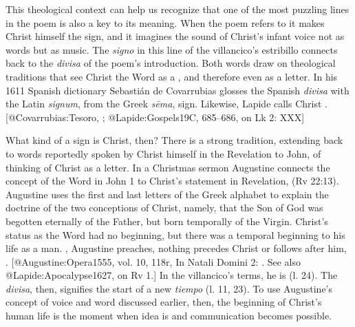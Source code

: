 This theological context can help us recognize that one of the most puzzling
lines in the poem is also a key to its meaning. 
When the poem refers to  it makes Christ himself
the sign, and it imagines the sound of Christ's infant voice not as words but as
music. 
The \emph{signo} in this line of the villancico's estribillo connects back to the
\emph{divisa} of the poem's introduction.
Both words draw on theological traditions that see Christ the Word as a ,
and therefore even as a letter.
In his 1611 Spanish dictionary Sebastián de Covarrubias glosses the Spanish
\emph{divisa} with the Latin \emph{signum}, from the Greek \emph{sēma}, sign. 
Likewise, Lapide calls Christ .
[@Covarrubias:Tesoro, ; @Lapide:Gospels19C, 685--686, on Lk 2:
XXX]

What kind of a sign is Christ, then?
There is a strong tradition, extending back to words reportedly spoken by Christ
himself in the Revelation to John, of thinking of Christ as a letter.
In a Christmas sermon Augustine connects the concept of the Word in John 1 to
Christ's statement in Revelation,  (Rv 22:13).
Augustine uses the first and last letters of the Greek alphabet to explain the
doctrine of the two conceptions of Christ, namely, that the Son of God was
begotten eternally of the Father, but born temporally of the Virgin.
Christ's status as the Word had no beginning, but there was a temporal beginning
to his life as a man.
, Augustine preaches, nothing
precedes Christ or follows after him, .
[@Augustine:Opera1555, vol. 10, 118r, In Natali Domini 2:
. See also @Lapide:Apocalypse1627, on
Rv 1.]
In the villancico's terms, he is  (l. 24).
The \emph{divisa}, then, signifies the start of a new \emph{tiempo} (l.  11, 23).
To use Augustine's concept of voice and word discussed earlier, then, the
beginning of Christ's human life is the moment when idea is  and communication becomes possible.

